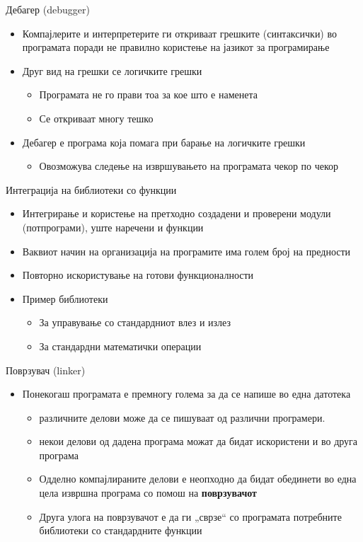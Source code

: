 \begin{frame}{Дебагер (debugger)}
\begin{itemize}
  \item Компајлерите и интерпретерите ги откриваат грешките (синтаксички) во
  програмата поради не правилно користење на јазикот за програмирање
  \item Друг вид на грешки се логичките грешки
  \begin{itemize}
  \item Програмата не го прави тоа за кое што е наменета 
  \item Се откриваат многу тешко
  \end{itemize}
  \item Дебагер е програма која помага при барање на логичките грешки
  \begin{itemize}
  \item Овозможува следење на извршувањето на програмата чекор по чекор
  \end{itemize}
\end{itemize}
\end{frame}

\begin{frame}{Интеграција на библиотеки со функции}
\begin{itemize}
  \item Интегрирање и користење на претходно создадени и проверени модули (потпрограми), уште наречени и функции
  \item Ваквиот начин на организација на програмите има голем број на предности
  \item Повторно искористување на готови функционалности
  \item Пример библиотеки
  \begin{itemize}
    \item За управување со стандардниот влез и излез
    \item За стандардни математички операции 
  \end{itemize}
\end{itemize}
\end{frame}

\begin{frame}{Поврзувач (linker)}
\begin{itemize}
  \item Понекогаш програмата е премногу голема за да се напише во една датотека
  \begin{itemize}
    \item различните делови може да се пишуваат од различни програмери.
    \item некои делови од дадена програма можат да бидат искористени и во друга програма 
    \item Одделно компајлираните делови е неопходно да бидат обединети во една
    цела извршна програма со помош на \textbf{поврзувачот}
    \item Друга улога на поврзувачот е да ги „сврзе“ со програмата потребните
     библиотеки со стандардните функции
  \end{itemize}
\end{itemize}

\end{frame}

